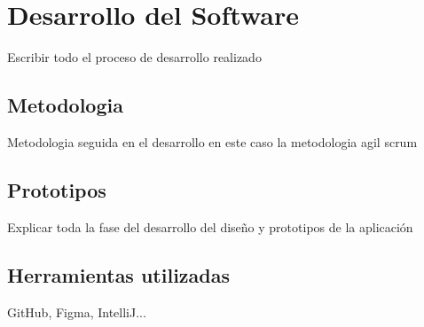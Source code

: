 \chapter{Desarrollo del Software}
\label{ch:Desarrollo del Software}

Escribir todo el proceso de desarrollo realizado

\section{Metodologia}

Metodologia seguida en el desarrollo en este caso la metodologia agil scrum

\section{Prototipos}

Explicar toda la fase del desarrollo del diseño y prototipos de la aplicación

\section{Herramientas utilizadas}

GitHub, Figma, IntelliJ...